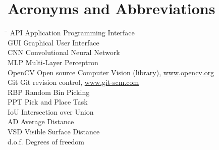 %

\section*{Acronyms and Abbreviations}
\label{sec:acronyms}

\begin{tabbing}
	\hspace*{3.5cm}		\= \kill
	API \> Application Programming Interface \\[1ex]
	GUI \> Graphical User Interface \\[1ex]
	CNN \> Convolutional Neural Network \\[1ex]
	MLP \> Multi-Layer Perceptron \\[1ex]
	OpenCV  \> Open source Computer Vision (library), \url{www.opencv.org} \\[1ex]
	Git  \> Git revision control, \url{www.git-scm.com} \\[1ex]
	RBP  \> Random Bin Picking \\[1ex]
	PPT  \> Pick and Place Task \\[1ex]
	IoU  \> Intersection over Union \\[1ex]
	AD  \> Average Distance \\[1ex]
	VSD  \> Visible Surface Distance \\[1ex]
	d.o.f.  \> Degrees of freedom \\[1ex]	
\end{tabbing}